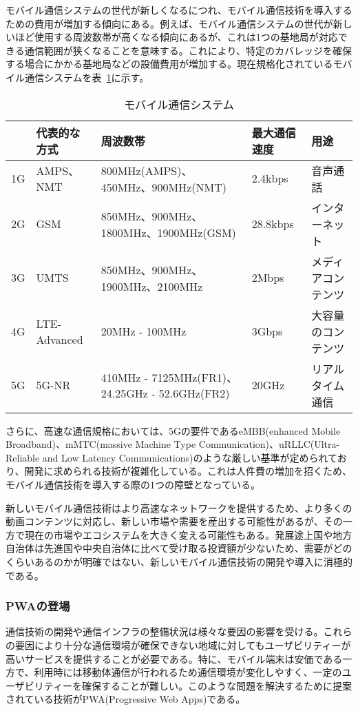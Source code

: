 モバイル通信システムの世代が新しくなるにつれ、モバイル通信技術を導入するための費用が増加する傾向にある。例えば、モバイル通信システムの世代が新しいほど使用する周波数帯が高くなる傾向にあるが、これは1つの基地局が対応できる通信範囲が狭くなることを意味する。これにより、特定のカバレッジを確保する場合にかかる基地局などの設備費用が増加する。現在規格化されているモバイル通信システムを表~\ref{table:モバイル通信システム}に示す。
\begin{table}
    \centering
    \caption{モバイル通信システム}
    \label{table:モバイル通信システム}
    \begin{tabular}{|p{3em}||p{10em}|p{12em}|p{5em}|p{10em}|}
         \hline
         & 代表的な方式 & 周波数帯 & 最大通信速度 & 用途 \\ \hline
         1G & AMPS、NMT & 800MHz(AMPS)、450MHz、900MHz(NMT) & 2.4kbps & 音声通話 \\ \hline
         2G & GSM & 850MHz、900MHz、1800MHz、1900MHz(GSM) & 28.8kbps & インターネット \\ \hline
         3G & UMTS & 850MHz、900MHz、1900MHz、2100MHz & 2Mbps & メディアコンテンツ \\ \hline
         4G & LTE-Advanced & 20MHz - 100MHz & 3Gbps & 大容量のコンテンツ \\ \hline
         5G & 5G-NR & 410MHz - 7125MHz(FR1)、24.25GHz - 52.6GHz(FR2) & 20GHz & リアルタイム通信 \\ \hline
    \end{tabular}
\end{table}

さらに、高速な通信規格においては、5Gの要件であるeMBB(enhanced Mobile Broadband)、mMTC(massive Machine Type Communication)、uRLLC(Ultra-Reliable and Low Latency Communications)のような厳しい基準が定められており、開発に求められる技術が複雑化している。これは人件費の増加を招くため、モバイル通信技術を導入する際の1つの障壁となっている。

新しいモバイル通信技術はより高速なネットワークを提供するため、より多くの動画コンテンツに対応し、新しい市場や需要を産出する可能性があるが、その一方で現在の市場やエコシステムを大きく変える可能性もある。発展途上国や地方自治体は先進国や中央自治体に比べて受け取る投資額が少ないため、需要がどのくらいあるのかが明確ではない、新しいモバイル通信技術の開発や導入に消極的である。
\subsubsection{PWAの登場}
\label{subsubsection:PWAの登場}
通信技術の開発や通信インフラの整備状況は様々な要因の影響を受ける。これらの要因により十分な通信環境が確保できない地域に対してもユーザビリティーが高いサービスを提供することが必要である。特に、モバイル端末は安価である一方で、利用時には移動体通信が行われるため通信環境が変化しやすく、一定のユーザビリティーを確保することが難しい。このような問題を解決するために提案されている技術がPWA(Progressive Web Apps)である。


